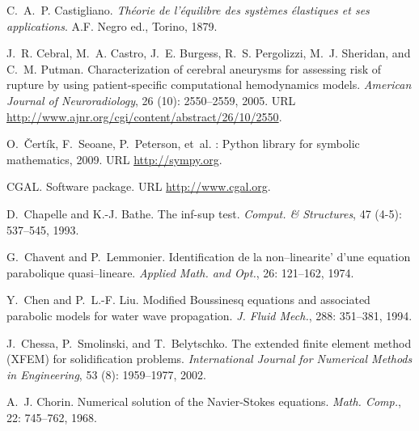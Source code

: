 \begin{thebibliography}{467}
C.~A.~P. Castigliano.
\newblock \emph{Th\'eorie de l'\'equilibre des syst\`emes \'elastiques et ses
  applications}.
\newblock A.F. Negro ed., Torino, 1879.

J.~R. Cebral, M.~A. Castro, J.~E. Burgess, R.~S. Pergolizzi, M.~J. Sheridan,
  and C.~M. Putman.
\newblock Characterization of cerebral aneurysms for assessing risk of rupture
  by using patient-specific computational hemodynamics models.
\newblock \emph{American Journal of Neuroradiology}, 26 (10):
  2550--2559, 2005.
\newblock URL \url{http://www.ajnr.org/cgi/content/abstract/26/10/2550}.

O.~\v{C}ert\'{i}k, F.~Seoane, P.~Peterson, et~al.
: {Python} library for symbolic mathematics, 2009.
\newblock URL \url{http://sympy.org}.

CGAL.
\newblock Software package.
\newblock URL \url{http://www.cgal.org}.

D.~Chapelle and K.-J. Bathe.
\newblock The inf-sup test.
\newblock \emph{Comput. \& Structures}, 47 (4-5): 537--545,
  1993.

G.~Chavent and P.~Lemmonier.
\newblock Identification de la non--linearite' d'une equation parabolique
  quasi--lineare.
\newblock \emph{Applied Math. and Opt.}, 26: 121--162, 1974.

Y.~Chen and P.~L.-F. Liu.
\newblock Modified {B}oussinesq equations and associated parabolic models for
  water wave propagation.
\newblock \emph{J. Fluid Mech.}, 288: 351--381, 1994.

J.~Chessa, P.~Smolinski, and T.~Belytschko.
\newblock The extended finite element method {(XFEM)} for solidification
  problems.
\newblock \emph{International Journal for Numerical Methods in Engineering},
  53 (8): 1959--1977, 2002.

A.~J. Chorin.
\newblock Numerical solution of the {N}avier-{S}tokes equations.
\newblock \emph{Math. Comp.}, 22: 745--762, 1968.


\end{thebibliography}

